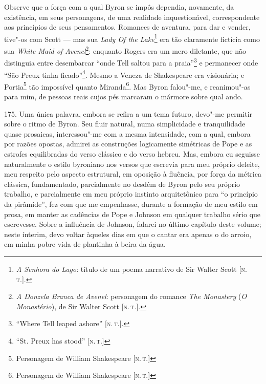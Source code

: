 Observe que a força com a qual Byron se impôs dependia, novamente, da
existência, em seus personagens, de uma realidade inquestionável,
correspondente aos princípios de seus pensamentos. Romances de aventura,
para dar e vender, tive"-os com Scott --- mas sua \emph{Lady Of the
Lake}\footnote{\emph{A Senhora do Lago}: título de um poema narrativo de
  Sir Walter Scott {[}\textsc{n.\,t.}{]}.} era tão claramente fictícia como sua
\emph{White Maid of Avenel}\footnote{\emph{A Donzela Branca de Avenel}:
  personagem do romance \emph{The Monastery} (\emph{O Monastério}), de
  Sir Walter Scott {[}\textsc{n.\,t.}{]}.}: enquanto Rogers era um mero
diletante, que não distinguia entre desembarcar ``onde Tell saltou para
a praia''\footnote{``Where Tell leaped ashore'' {[}\textsc{n.\,t.}{]}.} e
permanecer onde ``São Preux tinha ficado''\footnote{``St. Preux has
  stood'' {[}\textsc{n.\,t.}{]}}. Mesmo a Veneza de Shakespeare era visionária;
e Portia\footnote{Personagem de William Shakespeare {[}\textsc{n.\,t.}{]}} tão
impossível quanto Miranda\footnote{Personagem de William Shakespeare
  {[}\textsc{n.\,t.}{]}}. Mas Byron falou"-me, e reanimou"-as para mim, de
pessoas reais cujos pés marcaram o mármore sobre qual ando.

175. Uma única palavra, embora se refira a um tema futuro, devo"-me
permitir sobre o ritmo de Byron. Seu fluir natural, numa simplicidade e
tranquilidade quase prosaicas, interessou"-me com a mesma intensidade,
com a qual, embora por razões opostas, admirei as construções
logicamente simétricas de Pope e as estrofes equilibradas do verso
clássico e do verso hebreu. Mas, embora eu seguisse naturalmente o
estilo byroniano nos versos que escrevia para meu próprio deleite, meu
respeito pelo aspecto estrutural, em oposição à fluência, por força da
métrica clássica, fundamentado, parcialmente no desdém de Byron pelo seu
próprio trabalho, e parcialmente em meu próprio instinto arquitetônico
para ``o princípio da pirâmide'', fez com que me empenhasse, durante a
formação de meu estilo em prosa, em manter as cadências de Pope e
Johnson em qualquer trabalho sério que escrevesse. Sobre a influência de
Johnson, falarei no último capítulo deste volume; neste ínterim, devo
voltar àqueles dias em que o cantar era apenas o do arroio, em minha
pobre vida de plantinha à beira da água.

